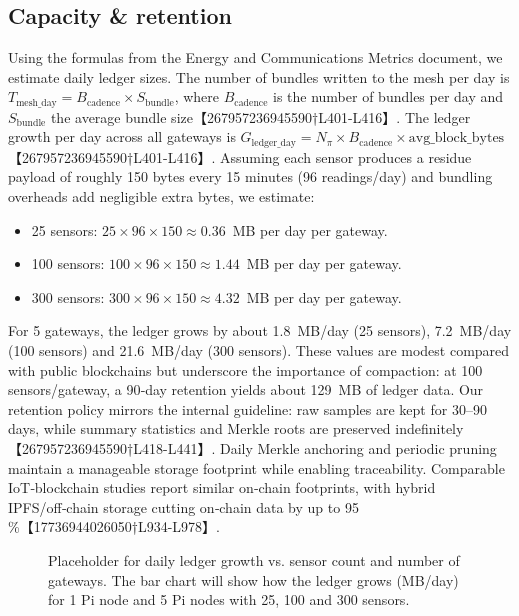 \subsection{Capacity \& retention}
\label{sec:capacity-retention}
Using the formulas from the Energy and Communications Metrics document, we estimate daily ledger sizes.  The number of bundles written to the mesh per day is $T_{\text{mesh\_day}} = B_{\text{cadence}} \times S_{\text{bundle}}$, where $B_{\text{cadence}}$ is the number of bundles per day and $S_{\text{bundle}}$ the average bundle size【267957236945590†L401-L416】.  The ledger growth per day across all gateways is $G_{\text{ledger\_day}} = N_{\pi} \times B_{\text{cadence}} \times \text{avg\_block\_bytes}$【267957236945590†L401-L416】.  Assuming each sensor produces a residue payload of roughly 150 bytes every 15 minutes (96 readings/day) and bundling overheads add negligible extra bytes, we estimate:
\begin{itemize}
  \item 25 sensors: $25 \times 96 \times 150 \approx 0.36$~MB per day per gateway.
  \item 100 sensors: $100 \times 96 \times 150 \approx 1.44$~MB per day per gateway.
  \item 300 sensors: $300 \times 96 \times 150 \approx 4.32$~MB per day per gateway.
\end{itemize}
For 5 gateways, the ledger grows by about 1.8~MB/day (25 sensors), 7.2~MB/day (100 sensors) and 21.6~MB/day (300 sensors).  These values are modest compared with public blockchains but underscore the importance of compaction: at 100 sensors/gateway, a 90‑day retention yields about 129~MB of ledger data.  Our retention policy mirrors the internal guideline: raw samples are kept for 30–90 days, while summary statistics and Merkle roots are preserved indefinitely【267957236945590†L418-L441】.  Daily Merkle anchoring and periodic pruning maintain a manageable storage footprint while enabling traceability.  Comparable IoT‑blockchain studies report similar on‑chain footprints, with hybrid IPFS/off‑chain storage cutting on‑chain data by up to 95 \%【17736944026050†L934-L978】.

\begin{figure}[!t]
  \centering
  \fbox{\rule{0pt}{1.5in}\rule{0.95\linewidth}{0pt}} %
  \caption{Placeholder for daily ledger growth vs. sensor count and number of gateways.  The bar chart will show how the ledger grows (MB/day) for 1 Pi node and 5 Pi nodes with 25, 100 and 300 sensors.}
  \label{fig:capacity-growth}
\end{figure}


